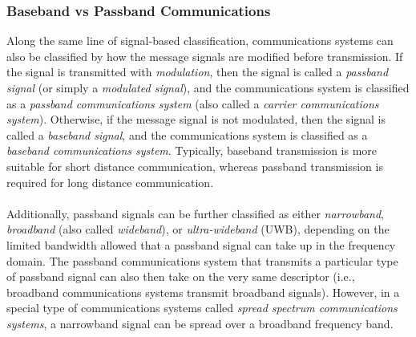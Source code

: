 \documentclass{report}
\begin{document}
\subsubsection{Baseband vs Passband Communications}
Along the same line of signal-based classification, communications systems can also be classified by how the message signals are modified before transmission. If the 
signal is transmitted with \emph{modulation}, then the signal is called a \emph{passband signal} (or simply a \emph{modulated signal}), 
and the communications system is classified as a \emph{passband communications system} (also called a \emph{carrier communications system}). Otherwise, if the message signal is 
not modulated, then the signal is called a \emph{baseband signal}, and the communications system is classified as a \emph{baseband communications system}. Typically, baseband transmission 
is more suitable for short distance communication, whereas passband transmission is required for long distance communication. 
\\ \\
Additionally, passband signals can be further classified as either \emph{narrowband}, \emph{broadband} (also called \emph{wideband}), or 
\emph{ultra-wideband} (UWB), depending on the limited bandwidth allowed that a passband signal can take up in the frequency domain. The passband communications system that 
transmits a particular type of passband signal can also then take on the very same descriptor (i.e., broadband communications systems transmit broadband signals). However, 
in a special type of communications systems called \emph{spread spectrum communications systems}, a narrowband signal can be spread over a broadband frequency band.
\end{document}
